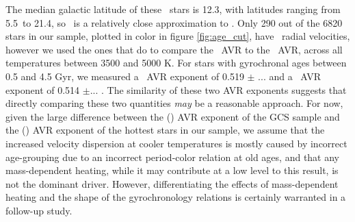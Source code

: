 The median galactic latitude of these \kepler\ stars is 12.3\degrees, with
latitudes ranging from 5.5\degrees\ to 21.4\degrees, so \vb\ is a relatively
close approximation to \vz.
Only 290 out of the 6820 stars in our sample, plotted in color in figure
\ref{fig:age_cut}, have \gaia\ radial velocities, however we used the ones
that do to compare the \vz\ AVR to the \vb\ AVR, across all temperatures
between 3500 and 5000 K.
For stars with gyrochronal ages between 0.5 and 4.5 Gyr, we measured a \vz\
AVR exponent of 0.519 $\pm$ ... and a \vb\ AVR exponent of 0.514 $\pm$... .
The similarity of these two AVR exponents suggests that directly comparing
these two quantities {\it may} be a reasonable approach.
For now, given the large difference between the (\vz) AVR exponent of the GCS
sample and the (\vb) AVR exponent of the hottest stars in our sample, we
assume that the increased velocity dispersion at cooler temperatures is mostly
caused by incorrect age-grouping due to an incorrect period-color relation at
old ages, and that any mass-dependent heating, while it may contribute at a
low level to this result, is not the dominant driver.
However, differentiating the effects of mass-dependent heating and the shape
of the gyrochronology relations is certainly warranted in a follow-up study.




